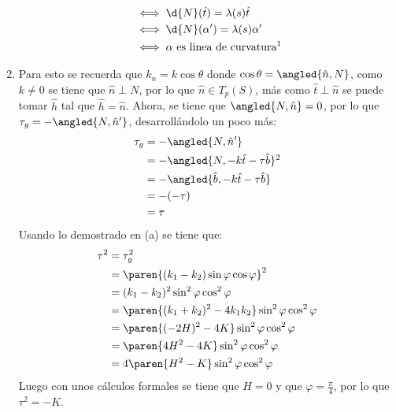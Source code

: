 \documentclass{homework}
\begin{document}
\begin{sol}
\begin{enumerate}
\begin{align*}
                           & \iff \d{N}(\hat{t})=\lambda(s)\hat{t}                     \\
                           & \iff \d{N}(\alpha')=\lambda(s)\alpha'                     \\
                           & \iff \text{\(\alpha\) es linea de curvatura\footnotemark} \\
              \end{align*}
        \item Para esto se recuerda que \(k_n=k\cos\theta\) donde \(\cos\theta=\angled{\hat{n},N}\), como \(k\neq0\) se tiene que \(\hat{n}\perp N\), por lo que \(\hat{n}\in T_p(S)\), más como \(\hat{t}\perp\hat{n}\) se puede tomar \(\hat{h}\) tal que \(\hat{h}=\hat{n}\). Ahora, se tiene que \(\angled{N,\hat{n}}=0\), por lo que \(\tau_g=-\angled{N,\hat{n}'}\), desarrollándolo un poco más:
              \begin{align*}
                  \tau_g & =-\angled{N,\hat{n}'}                           \\
                         & =-\angled{N,-k\hat{t}-\tau\hat{b}}\footnotemark \\
                         & =-\angled{\hat{b},-k\hat{t}-\tau\hat{b}}        \\
                         & =-(-\tau)                                       \\
                         & =\tau                                           \\
              \end{align*}
              Usando lo demostrado en (a) se tiene que:
              \begin{align*}
                  \tau^2 & =\tau_g^2                                              \\
                         & =\paren{(k_1-k_2)\sin\varphi\cos\varphi}^2             \\
                         & =(k_1-k_2)^2\sin^2\varphi\cos^2\varphi                 \\
                         & =\paren{(k_1+k_2)^2-4k_1k_2}\sin^2\varphi\cos^2\varphi \\
                         & =\paren{(-2H)^2-4K}\sin^2\varphi\cos^2\varphi          \\
                         & =\paren{4H^2-4K}\sin^2\varphi\cos^2\varphi             \\
                         & =4\paren{H^2-K}\sin^2\varphi\cos^2\varphi              \\
              \end{align*}
              Luego con unos cálculos formales se tiene que \(H=0\) y que \(\varphi=\frac\pi4\), por lo que \(\tau^2=-K\).
    \end{enumerate}
\end{sol}
\end{document}
